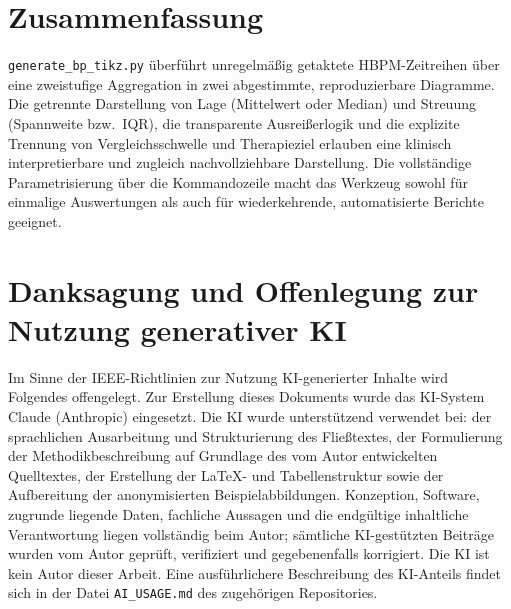 \documentclass[conference]{IEEEtran}
\begin{document}
\section{Zusammenfassung}
\texttt{generate\_bp\_tikz.py} überführt unregelmäßig getaktete
HBPM-Zeitreihen über eine zweistufige Aggregation in zwei abgestimmte,
reproduzierbare Diagramme. Die getrennte Darstellung von Lage (Mittelwert oder
Median) und Streuung (Spannweite bzw.\ IQR), die transparente Ausreißerlogik
und die explizite Trennung von Vergleichsschwelle und Therapieziel erlauben
eine klinisch interpretierbare und zugleich nachvollziehbare Darstellung. Die
vollständige Parametrisierung über die Kommandozeile macht das Werkzeug
sowohl für einmalige Auswertungen als auch für wiederkehrende, automatisierte
Berichte geeignet.

\section*{Danksagung und Offenlegung zur Nutzung generativer KI}
Im Sinne der IEEE-Richtlinien zur Nutzung KI-generierter Inhalte wird Folgendes
offengelegt. Zur Erstellung dieses Dokuments wurde das KI-System Claude
(Anthropic) eingesetzt. Die KI wurde unterstützend verwendet bei: der
sprachlichen Ausarbeitung und Strukturierung des Fließtextes, der Formulierung
der Methodikbeschreibung auf Grundlage des vom Autor entwickelten Quelltextes,
der Erstellung der LaTeX- und Tabellenstruktur sowie der Aufbereitung der
anonymisierten Beispielabbildungen. Konzeption, Software, zugrunde liegende
Daten, fachliche Aussagen und die endgültige inhaltliche Verantwortung liegen
vollständig beim Autor; sämtliche KI-gestützten Beiträge wurden vom Autor
geprüft, verifiziert und gegebenenfalls korrigiert. Die KI ist kein Autor dieser
Arbeit. Eine ausführlichere Beschreibung des KI-Anteils findet sich in der Datei
\texttt{AI\_USAGE.md} des zugehörigen Repositories.
\end{document}
